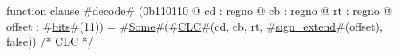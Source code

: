 function clause #\hyperref[zdecode]{decode}# (0b110110 @ cd : regno @ cb : regno @ rt : regno @ offset : #\hyperref[zbits]{bits}#(11)) = #\hyperref[zSome]{Some}#(#\hyperref[zCLC]{CLC}#(cd, cb, rt, #\hyperref[zsignzyextend]{sign\_extend}#(offset), false))            /* CLC */

